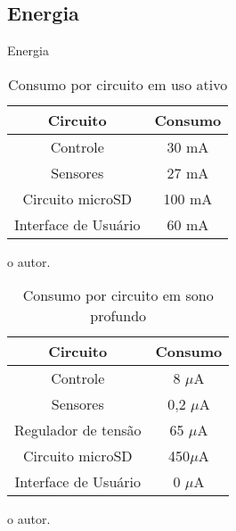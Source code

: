 \subsection{Energia}
\begin{frame}{Energia}

	\begin{table}[!h]
	\captionsetup{width=9cm}%
	\caption{\label{tab:consumos_circuitos} Consumo por circuito em uso ativo}%
% 	
		\begin{tabular}{cc}
			\toprule
			Circuito & Consumo \\
			\midrule \midrule
			Controle  &  30  mA \\
			Sensores  &  27 mA  \\
			Circuito microSD   &   100 mA\\
			Interface de Usuário & 60 mA\\
		    \bottomrule
		\end{tabular}%
	{%
	\tiny{o autor.}%
    }
    \end{table}

	\begin{table}[!h]
	\captionsetup{width=9cm}%
	\caption{\label{tab:consumos_sono_profundo} Consumo por circuito em sono profundo}%
% 	
		\begin{tabular}{cc}
			\toprule
			Circuito & Consumo \\
			\midrule \midrule
			Controle  &  8 $\mu$A \\
			Sensores  &  0,2 $\mu$A  \\
			Regulador de tensão  & 65 $\mu$A\\
			Circuito microSD & 450$\mu$A \\
			Interface de Usuário & 0 $\mu$A \\
		    \bottomrule
		\end{tabular}%
	{%
	\tiny{o autor.}%
    }
    \end{table}


    
\end{frame}


